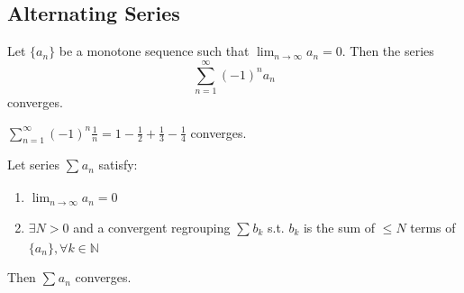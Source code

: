 
\subsection{Alternating Series}

\begin{theorem}
    \label{thm:alternating-series-1}
    Let $\{ a_n \} $ be a monotone sequence
    such that $\lim_{n \to \infty}a_n = 0$. 
    Then the series 
    \[
        \sum\limits_{n = 1}^{\infty} (-1)^{n} a_n
    \]
    converges.
\end{theorem}

\begin{example}
    $\sum\limits_{n= 1}^{\infty}  (-1)^n \frac{1}{n} = 1 - \frac{1}{2} + \frac{1}{3} - \frac{1}{4}$
    converges.
\end{example}

\begin{theorem}
    \label{thm:alternating-series-2}
    Let series $\sum\limits_{}^{} a_n$ satisfy:
    \begin{enumerate}
        \item $\lim_{n \to \infty}a_n = 0$
        \item $\exists N > 0$ and a convergent regrouping $\sum\limits_{}^{} b_k$
        s.t. $b_k$ is the sum of $\leq N$ terms of 
        $\{ a_n \}, \forall k \in \mathbb{N}$
    \end{enumerate} 
    Then $\sum\limits_{}^{} a_n$ converges.
\end{theorem}

